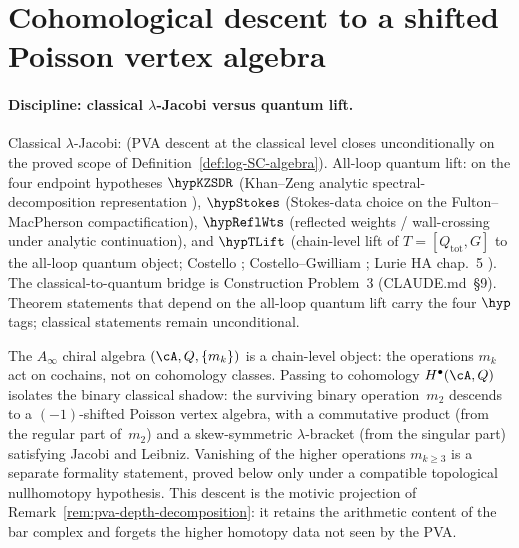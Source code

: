 
\section{Cohomological descent to a shifted Poisson vertex algebra}
\label{sec:PVA_descent}
\label{sec:Ainfty-to-PVA}

\paragraph{Discipline: classical $\lambda$-Jacobi versus quantum lift.}
Classical $\lambda$-Jacobi: \ClaimStatusProvedHere{} (PVA descent at the
classical level closes unconditionally on the proved scope of
Definition~\ref{def:log-SC-algebra}). All-loop quantum lift:
\ClaimStatusConditional{} on the four endpoint hypotheses
$\hypKZSDR$ (Khan--Zeng analytic spectral-decomposition representation
\cite{KZ25}), $\hypStokes$ (Stokes-data choice on the Fulton--MacPherson
compactification), $\hypReflWts$ (reflected weights / wall-crossing
under analytic continuation), and $\hypTLift$ (chain-level lift of
$T = [Q_{\mathrm{tot}}, G]$ to the all-loop quantum object;
Costello \cite{Costello2011Renorm}; Costello--Gwilliam \cite{CG17};
Lurie HA chap.~5 \cite{LurieHA}). The classical-to-quantum bridge is
Construction Problem~3 (CLAUDE.md~\S9). Theorem statements that depend
on the all-loop quantum lift carry the four $\hyp$ tags; classical
statements remain unconditional.

The $A_\infty$ chiral algebra $(\cA, Q, \{m_k\})$ is a chain-level
object: the operations $m_k$ act on cochains, not on cohomology
classes. Passing to cohomology $H^\bullet(\cA, Q)$ isolates the
binary classical shadow: the surviving binary operation~$m_2$
descends to a $(-1)$-shifted Poisson vertex algebra, with a
commutative product (from the regular part of~$m_2$) and a
skew-symmetric $\lambda$-bracket (from the singular part)
satisfying Jacobi and Leibniz. Vanishing of the higher operations
$m_{k\ge3}$ is a separate formality statement, proved below only
under a compatible topological nullhomotopy hypothesis. This
descent is the motivic projection of
Remark~\ref{rem:pva-depth-decomposition}: it retains the arithmetic
content of the bar complex and forgets the higher homotopy data not
seen by the PVA.

